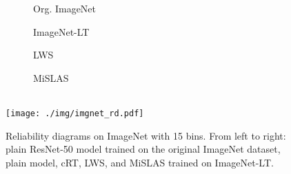 \documentclass[final]{cvpr}
\begin{document}
	
	\begin{figure}[h]
		\begin{subfigure}{0.195\linewidth}
			\begin{center}
				{\quad \quad Org. ImageNet}
			\end{center}
		\end{subfigure}
		\hfill
		\begin{subfigure}{0.195\linewidth}
			\centering
			{\quad  \hspace{3pt}  ImageNet-LT}
		\end{subfigure}
		\hfill
		\begin{subfigure}{0.195\linewidth}
			\centering
			{}
		\end{subfigure} 
		\hfill
		\begin{subfigure}{0.195\linewidth}
			\centering
			{\hspace{2pt}  LWS}
		\end{subfigure} 
		\hfill
		\begin{subfigure}{0.195\linewidth}
			\centering
			{ MiSLAS}
		\end{subfigure}\\
		\centering
		\texttt{[image: ./img/imgnet\_rd.pdf]}
		\vspace{-15pt}
		\caption{Reliability diagrams on ImageNet with 15 bins. From left to right: plain ResNet-50 model trained on the original ImageNet dataset, plain model, cRT, LWS, and MiSLAS trained on ImageNet-LT.}
		\vspace{-10pt}
		\label{fig:more_rd_imgnet}
	\end{figure}
	
	
	
\end{document}
